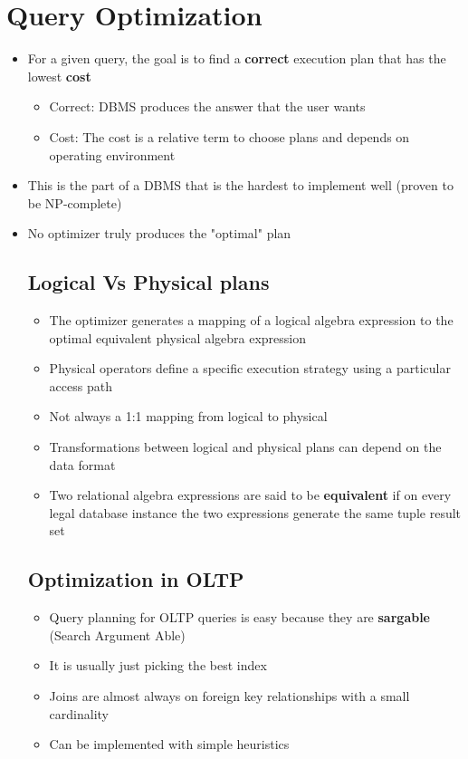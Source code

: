 \documentclass[11pt]{article}
\begin{document}
\maketitle
\thispagestyle{plain}

\section{Query Optimization}
\begin{itemize}
    \item For a given query, the goal is to find a \textbf{correct} execution plan that has the lowest \textbf{cost}
    \begin{itemize}
        \item Correct: DBMS produces the answer that the user wants
        \item Cost: The cost is a relative term to choose plans and depends on operating environment
    \end{itemize}
    \item This is the part of a DBMS that is the hardest to implement well (proven to be NP-complete)
    \item No optimizer truly produces the "optimal" plan

    \subsection*{Logical Vs Physical plans}
    \begin{itemize}
        \item The optimizer generates a mapping of a logical algebra expression to the optimal equivalent physical algebra expression
        \item Physical operators define a specific execution strategy using a particular access path
        \item Not always a 1:1 mapping from logical to physical
        \item Transformations between logical and physical plans can depend on the data format
        \item Two relational algebra expressions are said to be \textbf{equivalent} if on every legal database instance the two expressions generate the same tuple result set
    \end{itemize}

    \subsection*{Optimization in OLTP}
    \begin{itemize}
        \item Query planning for OLTP queries is easy because they are \textbf{sargable} (Search Argument Able)
        \item It is usually just picking the best index
        \item Joins are almost always on foreign key relationships with a small cardinality
        \item Can be implemented with simple heuristics
    \end{itemize}

\end{itemize}
\end{document}
